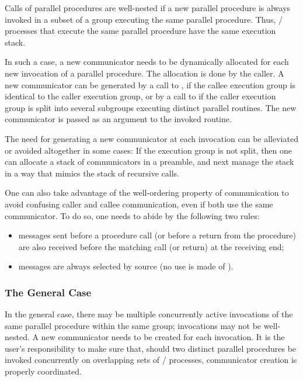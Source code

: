 Calls of parallel procedures are well-nested if a new parallel
procedure is always invoked in a subset of a group executing the same
parallel procedure. Thus, \MPI/ processes that execute the same parallel
procedure have the same execution stack.

In such a case, a new communicator needs to be dynamically allocated
for each new invocation of a parallel procedure.
The allocation is done by the caller.
A new communicator can be generated by a call to
, if the callee execution group is identical
to the caller execution group, or by a call to
 if the caller execution group is split into
several subgroups executing distinct parallel routines.
The new communicator is passed as an argument to the invoked routine.

The need for generating a new communicator at each invocation can be
alleviated or avoided altogether in some cases: If the execution
group is not split, then one can allocate a stack of communicators in
a preamble, and next manage the stack in a way that mimics
the stack of recursive calls.

One can also take advantage of the
well-ordering property of communication to avoid confusing caller and
callee communication, even if both use the same communicator. To do
so, one needs to abide by the following two rules:
\begin{itemize}
\item
messages sent before a procedure call (or before a return from the
procedure)
are also received before the matching call (or return) at the
receiving end;
\item
messages are always selected by source (no use is made of
).
\end{itemize}

\subsubsection{The General Case}
\label{sec:context:general-case}

In the general case, there may be multiple concurrently active
invocations of the same parallel procedure within the same group;
invocations may not be well-nested. A new communicator needs to be
created for each invocation. It is the user's responsibility to make
sure that, should two distinct parallel procedures be invoked
concurrently on overlapping sets of \MPI/ processes,
communicator creation
is properly coordinated.
